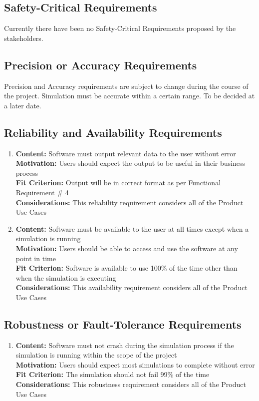 \documentclass[paper=letter, fontsize=10pt]{scrartcl}
\numberwithin{equation}{section}		%
\numberwithin{figure}{section}			%
\numberwithin{table}{section}				%
\begin{document}
\subsection{Safety-Critical Requirements}
Currently there have been no Safety-Critical Requirements proposed by the stakeholders.
\subsection{Precision or Accuracy Requirements}
Precision and Accuracy requirements are subject to change during the course of the project. Simulation must be accurate within a certain range. To be decided at a later date. 
\subsection{Reliability and Availability Requirements}
	\begin{enumerate}
		\item \textbf{Content:} Software must output relevant data to the user without error
		\\	  \textbf{Motivation:} Users should expect the output to be useful in their business process
		\\	  \textbf{Fit Criterion:} Output will be in correct format as per Functional Requirement \# 4
		\\	  \textbf{Considerations:} This reliability requirement considers all of the Product Use Cases 
		\item \textbf{Content:} Software must be available to the user at all times except when a simulation is running
		\\	  \textbf{Motivation:} Users should be able to access and use the software at any point in time
		\\	  \textbf{Fit Criterion:} Software is available to use 100\% of the time other than when the simulation is executing
		\\	  \textbf{Considerations:} This availability requirement considers all of the Product Use Cases 
	\end{enumerate}
\subsection{Robustness or Fault-Tolerance Requirements}
	\begin{enumerate}
		\item \textbf{Content:} Software must not crash during the simulation process if the simulation is running within the scope of the project
		\\	  \textbf{Motivation:} Users should expect most simulations to complete without error
		\\	  \textbf{Fit Criterion:} The simulation should not fail 99\% of the time
		\\	  \textbf{Considerations:} This robustness requirement considers all of the Product Use Cases
	\end{enumerate}
\end{document}
